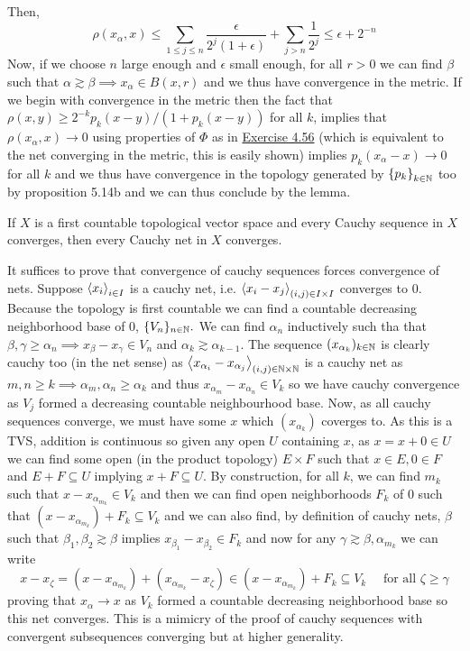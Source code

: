 \documentclass[12pt,a4paper]{article}
\begin{document}
\begin{solution}
\begin{enumerate}[label=\alph*.]
            Then, 
            \[
                \rho(x_\alpha,x)\leq\sum_{1\leq j\leq n}\frac{\epsilon}{2^j(1+\epsilon)}+\sum_{j>n}\frac{1}{2^j}\leq\epsilon+2^{-n}
            \]
            Now, if we choose $n$ large enough and $\epsilon$ small enough, for all $r>0$ we can find $\beta$ such that $\alpha\gtrsim\beta\implies x_\alpha\in B(x,r)$ and we thus have convergence in the metric. 
            If we begin with convergence in the metric then the fact that $\rho(x,y)\geq 2^{-k}p_k(x-y)/(1+p_k(x-y))$ for all $k$, implies that $\rho(x_\alpha,x)\to 0$ using properties of $\Phi$ as in \hyperref[prob:4-56]{Exercise 4.56} (which is equivalent to the net converging in the metric, this is easily shown) implies $p_k(x_\alpha-x)\to 0$ for all $k$ and we thus have convergence in the topology generated by $ \qty{p_k}_{k\in\mathbb{N}}$ too by proposition 5.14b and we can thus conclude by the lemma. 
    \end{enumerate}
\end{solution}
\begin{problem}\label{prob:5-44}
If $X$ is a first countable topological vector space and every Cauchy sequence in $X$ converges, then every Cauchy net in $X$ converges.
\end{problem}
\begin{solution}
    It suffices to prove that convergence of cauchy sequences forces convergence of nets. 
    Suppose $\left\langle x_i\right\rangle_{i\in I}$ is a cauchy net, i.e. $\left\langle x_i-x_j\right\rangle_{(i,j)\in I\times I}$ converges to $0.$ 
    Because the topology is first countable we can find a countable decreasing neighborhood base of $0$, $\{V_n\}_{n\in\mathbb{N}}.$ 
    We can find $\alpha_n$ inductively such tha that $\beta,\gamma\geq\alpha_n\implies x_\beta-x_\gamma\in V_n$ and $\alpha_k\gtrsim\alpha_{k-1}.$ 
    The sequence $(x_{\alpha_k})_{k\in\mathbb{N}}$ is clearly cauchy too (in the net sense) as $\left\langle x_{\alpha_i}-x_{\alpha_j}\right\rangle_{(i,j)\in\mathbb{N}\times\mathbb{N}}$ is a cauchy net as $m,n\geq k\implies\alpha_m,\alpha_n\geq\alpha_k$ and thus $x_{\alpha_m}-x_{\alpha_n}\in V_k$ so we have cauchy convergence as $V_j$ formed a decreasing countable neighbourhood base. 
    Now, as all cauchy sequences converge, we must have some $x$ which $(x_{\alpha_k})$ coverges to. 
    As this is a TVS, addition is continuous so given any open $U$ containing $x$, as $x=x+0\in U$ we can find some open (in the product topology) $E\times F$ such that $x\in E,0\in F$ and $E+F \subseteq U$ implying $x+F \subseteq U$. 
    By construction, for all $k$, we can find $m_k$ such that $x-x_{\alpha_{m_k}}\in V_k$ and then we can find open neighborhoods $F_k$ of $0$ such that $(x-x_{\alpha_{m_k}})+F_k \subseteq V_k$ and we can also find, by definition of cauchy nets, $\beta$ such that $\beta_1,\beta_2\gtrsim\beta$ implies $x_{\beta_1}-x_{\beta_2}\in F_k$ and now for any $\gamma\gtrsim\beta,\alpha_{m_k}$ we can write 
    \[
        x-x_\zeta=(x-x_{\alpha_{m_k}})+(x_{\alpha_{m_k}}-x_\zeta)\in(x-x_{\alpha_{m_k}})+ F_k \subseteq V_k\quad\text{ for all }\zeta\geq\gamma
    \]
    proving that $x_\alpha\to x$ as $V_k$ formed a countable decreasing neighborhood base so this net converges. 
    This is a mimicry of the proof of cauchy sequences with convergent subsequences converging but at higher generality. 
\end{solution}
\end{document}
